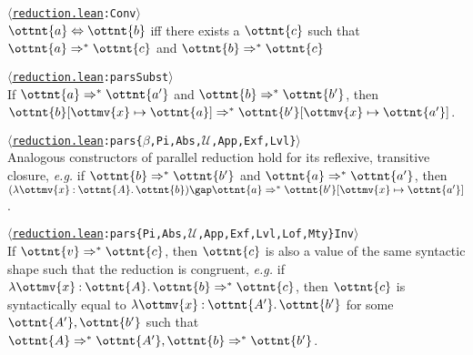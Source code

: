 \documentclass[a4paper,UKenglish,cleveref,autoref,thm-restate]{lipics-v2021}
\makeatletter
\newcommand{\repo}{https://github.com/ionathanch/TTBFL}
\newcommand{\eg}{\textit{e.g.}\@\xspace}
\newcommand{\thmref}[2]{%
  $\langle$\href{\repo/tree/main/src/#1}{\texttt{#1}}\texttt{:#2}$\rangle$%
}
\makeatother
\begin{document}
\begin{definition}[Conversion] \thmref{reduction.lean}{Conv} \\
  $ \ottnt{a}  \Leftrightarrow  \ottnt{b} $ iff there exists a $\ottnt{c}$ such that
  $ \ottnt{a}  \Rightarrow^\ast  \ottnt{c} $ and $ \ottnt{b}  \Rightarrow^\ast  \ottnt{c} $
\end{definition}

\begin{lemma}[Substitution (p.r.)] \thmref{reduction.lean}{parsSubst} \label{lem:pars:subst} \\
  If $ \ottnt{a}  \Rightarrow^\ast  \ottnt{a'} $ and $ \ottnt{b}  \Rightarrow^\ast  \ottnt{b'} $,
  then $  \ottnt{b} [  \ottmv{x}  \mapsto  \ottnt{a}  ]   \Rightarrow^\ast   \ottnt{b'} [  \ottmv{x}  \mapsto  \ottnt{a'}  ]  $.
\end{lemma}

\begin{lemma}[Construction (p.r.)] \thmref{reduction.lean}{pars\{$\beta$,Pi,Abs,$\mathcal{U}$,App,Exf,Lvl\}} \label{lem:pars:cons} \\
  Analogous constructors of parallel reduction hold
  for its reflexive, transitive closure,
  \eg if $ \ottnt{b}  \Rightarrow^\ast  \ottnt{b'} $ and $ \ottnt{a}  \Rightarrow^\ast  \ottnt{a'} $,
  then $   (  \lambda  \ottmv{x}  \mathbin{:}  \ottnt{A}  \mathpunct{.}  \ottnt{b}  )   \gap  \ottnt{a}   \Rightarrow^\ast   \ottnt{b'} [  \ottmv{x}  \mapsto  \ottnt{a'}  ]  $.
\end{lemma}

\begin{lemma}[Inversion (p.r.)] \thmref{reduction.lean}{pars\{Pi,Abs,$\mathcal{U}$,App,Exf,Lvl,Lof,Mty\}Inv} \label{lem:pars:inv} \\
  If $ \ottnt{v}  \Rightarrow^\ast  \ottnt{c} $, then $\ottnt{c}$ is also a value of the same syntactic shape
  such that the reduction is congruent,
  \eg if $  \lambda  \ottmv{x}  \mathbin{:}  \ottnt{A}  \mathpunct{.}  \ottnt{b}   \Rightarrow^\ast  \ottnt{c} $, then $\ottnt{c}$ is syntactically equal to $ \lambda  \ottmv{x}  \mathbin{:}  \ottnt{A'}  \mathpunct{.}  \ottnt{b'} $
  for some $\ottnt{A'}, \ottnt{b'}$ such that $ \ottnt{A}  \Rightarrow^\ast  \ottnt{A'} ,  \ottnt{b}  \Rightarrow^\ast  \ottnt{b'} $.
\end{lemma}
\end{document}
